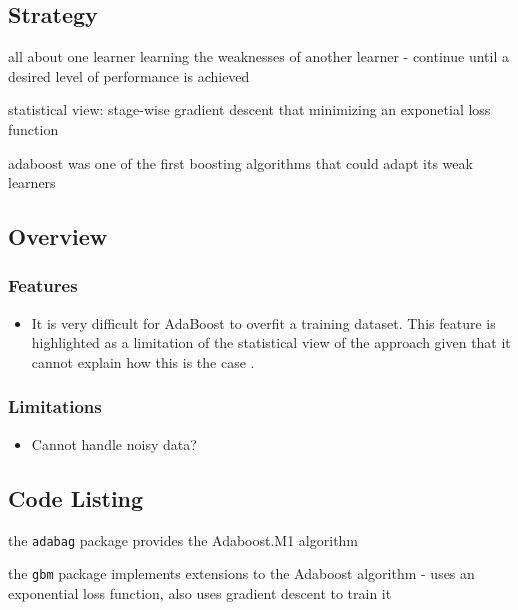 \subsection{Strategy}

all about one learner learning the weaknesses of another learner - continue until a desired level of performance is achieved

statistical view: stage-wise gradient descent that minimizing an exponetial loss function

adaboost was one of the first boosting algorithms that could adapt its weak learners


\subsection{Overview}

\subsubsection{Features}

\begin{itemize}
	\item It is very difficult for AdaBoost to overfit a training dataset. This feature is highlighted as a limitation of the statistical view of the approach given that it cannot explain how this is the case \cite{Mease2008}.
\end{itemize}

\subsubsection{Limitations}

\begin{itemize}
	\item Cannot handle noisy data? \cite{Long2010}
\end{itemize}


\subsection{Code Listing}



the \texttt{adabag} package provides the Adaboost.M1 algorithm \cite{Cortes2011}

the \texttt{gbm} package implements extensions to the Adaboost algorithm - uses an exponential loss function, also uses gradient descent to train it  \cite{Ridgeway2007a}

